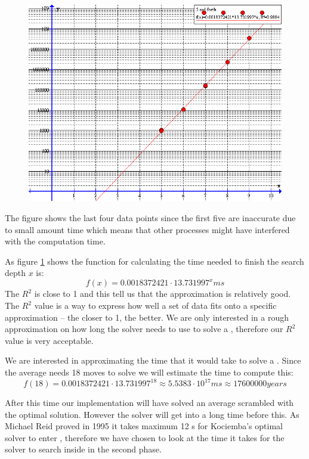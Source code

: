 \begin{figure}[htb]
	\centering
		\includegraphics[scale=0.5]{input/pics/timeFunction}
	\caption{}
	\label{fig:timeFunction}
\end{figure}

The figure shows the last four data points since the first five are inaccurate due to small amount time which means that other processes might have interfered with the computation time.

As figure \ref{fig:timeFunction} shows the function for calculating the time needed to finish the search depth $x$ is:
\[
f(x)=0.0018372421 \cdot 13.731997^{x} ms
\]
The $R^2$ is close to 1 and this tell us that the approximation is relatively good. The $R^2$ value is a way to express how well a set of data fits onto a specific approximation -- the closer to 1, the better. We are only interested in a rough approximation on how long the solver needs to use to solve a \rubik{}, therefore our $R^2$ value is very acceptable.

We are interested in approximating the time that it would take to solve a \rubik{}. Since the average \rubik{} needs 18 moves to solve \cite{kociemba09} we will estimate the time to compute this:
\[
f(18) = 0.0018372421 \cdot 13.731997^{18} \approx 5.5383 \cdot 10^{17} ms \approx 17600000 years
\]

After this time our implementation will have solved an average scrambled \rubik{} with the optimal solution.
However the solver will get into  a long time before this.
As Michael Reid proved in 1995 it \cite{knowledgerush2} takes maximum 12 \twist{}s for Kociemba's optimal solver to enter , therefore we have chosen to look at the time it takes for the solver to search inside  in the second phase.

